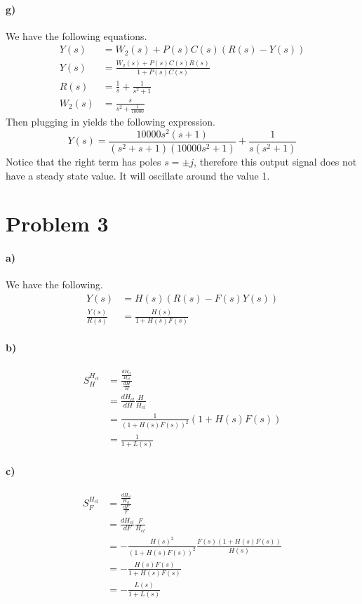 \documentclass[12pt]{article}
\begin{document}
\paragraph{g)}

We have the following equations.
\begin{align*}
    Y(s)&=W_2(s)+P(s)C(s)(R(s)-Y(s))\\
    Y(s)&=\frac{W_2(s)+P(s)C(s)R(s)}{1+P(s)C(s)}\\
    R(s)&=\frac{1}{s}+\frac{1}{s^2+1}\\
    W_2(s)&=\frac{s}{s^2+\frac{1}{10000}}
\end{align*}
Then plugging in yields the following expression.
\[Y(s)=\frac{10000s^2(s+1)}{(s^2+s+1)(10000s^2+1)} + \frac{1}{s(s^2+1)}\]
Notice that the right term has poles \(s=\pm j\), therefore this output signal does
not have a steady state value. It will oscillate around the value 1.

\section*{Problem 3}

\paragraph{a)}

We have the following.
\begin{align*}
    Y(s)&=H(s)(R(s)-F(s)Y(s))\\
    \frac{Y(s)}{R(s)}&=\frac{H(s)}{1+H(s)F(s)}
\end{align*}

\paragraph{b)}

\begin{align*}
    S_H^{H_{cl}}&=\frac{\frac{dH_{cl}}{H_{cl}}}{\frac{dH}{H}}\\
    &=\frac{dH_{cl}}{dH}\frac{H}{H_{cl}}\\
    &=\frac{1}{(1+H(s)F(s))^2}(1+H(s)F(s))\\
    &=\frac{1}{1+L(s)}
\end{align*}

\paragraph{c)}

\begin{align*}
    S_F^{H_{cl}}&=\frac{\frac{dH_{cl}}{H_{cl}}}{\frac{dF}{F}}\\
    &=\frac{dH_{cl}}{dF}\frac{F}{H_{cl}}\\
    &=-\frac{H(s)^2}{(1+H(s)F(s))^2}\frac{F(s)(1+H(s)F(s))}{H(s)}\\
    &=-\frac{H(s)F(s)}{1+H(s)F(s)}\\
    &=-\frac{L(s)}{1+L(s)}
\end{align*}
\end{document}
